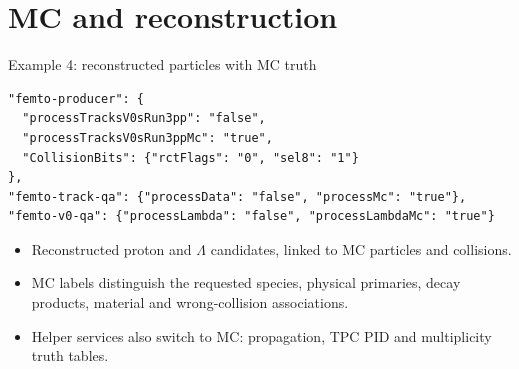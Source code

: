 \section{MC and reconstruction}

\begin{frame}[fragile]{Example 4: reconstructed particles with MC truth}
 \begin{lstlisting}
"femto-producer": {
  "processTracksV0sRun3pp": "false",
  "processTracksV0sRun3ppMc": "true",
  "CollisionBits": {"rctFlags": "0", "sel8": "1"}
},
"femto-track-qa": {"processData": "false", "processMc": "true"},
"femto-v0-qa": {"processLambda": "false", "processLambdaMc": "true"}
 \end{lstlisting}
 \begin{itemize}
 \item Reconstructed proton and $\Lambda$ candidates, linked to MC particles and collisions.
 \item MC labels distinguish the requested species, physical primaries, decay products, material and wrong-collision associations.
 \item Helper services also switch to MC: propagation, TPC PID and multiplicity truth tables.
 \end{itemize}
\end{frame}

